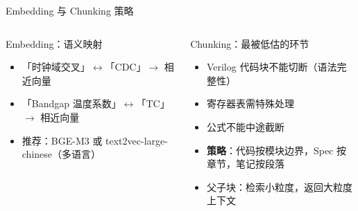 \documentclass[UTF8,11pt,aspectratio=169]{beamer}
\begin{document}
\begin{frame}{Embedding 与 Chunking 策略}
  \begin{columns}[T]
    \begin{block}{Embedding：语义映射}
      \begin{itemize}
        \item 「时钟域交叉」$\leftrightarrow$「CDC」$\rightarrow$ 相近向量
        \item 「Bandgap 温度系数」$\leftrightarrow$「TC」$\rightarrow$ 相近向量
        \item 推荐：BGE-M3 或 text2vec-large-chinese（多语言）
      \end{itemize}
    \end{block}

    \begin{block}{Chunking：最被低估的环节}
      \begin{itemize}
        \item Verilog 代码块不能切断（语法完整性）
        \item 寄存器表需特殊处理
        \item 公式不能中途截断
        \item \textbf{策略}：代码按模块边界，Spec 按章节，笔记按段落
        \item 父子块：检索小粒度，返回大粒度上下文
      \end{itemize}
    \end{block}
  \end{columns}
\end{frame}
\end{document}
